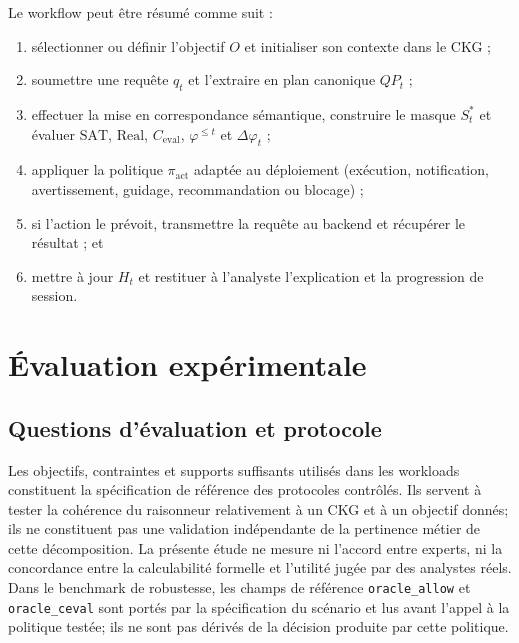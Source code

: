 \documentclass[journal]{IEEEtran}
\begin{document}
Le workflow peut être résumé comme suit :
\begin{enumerate}
  \item sélectionner ou définir l'objectif $O$ et initialiser son contexte dans le CKG ;
  \item soumettre une requête $q_t$ et l'extraire en plan canonique $QP_t$ ;
  \item effectuer la mise en correspondance sémantique, construire le masque $S_t^*$ et évaluer $\mathrm{SAT}$, $\mathrm{Real}$, $C_{\mathrm{eval}}$, $\varphi^{\le t}$ et $\Delta\varphi_t$ ;
  \item appliquer la politique $\pi_{\mathrm{act}}$ adaptée au déploiement (exécution, notification, avertissement, guidage, recommandation ou blocage) ;
  \item si l'action le prévoit, transmettre la requête au backend et récupérer le résultat ; et
  \item mettre à jour $H_t$ et restituer à l'analyste l'explication et la progression de session.
\end{enumerate}


\section{Évaluation expérimentale}
\label{sec:exp}
\label{sec:experiments}

\subsection{Questions d'évaluation et protocole}

Les objectifs, contraintes et supports suffisants utilisés dans les workloads constituent la spécification de référence des protocoles contrôlés. Ils servent à tester la cohérence du raisonneur relativement à un CKG et à un objectif donnés; ils ne constituent pas une validation indépendante de la pertinence métier de cette décomposition. La présente étude ne mesure ni l'accord entre experts, ni la concordance entre la calculabilité formelle et l'utilité jugée par des analystes réels. Dans le benchmark de robustesse, les champs de référence \texttt{oracle\_allow} et \texttt{oracle\_ceval} sont portés par la spécification du scénario et lus avant l'appel à la politique testée; ils ne sont pas dérivés de la décision produite par cette politique.
\end{document}
